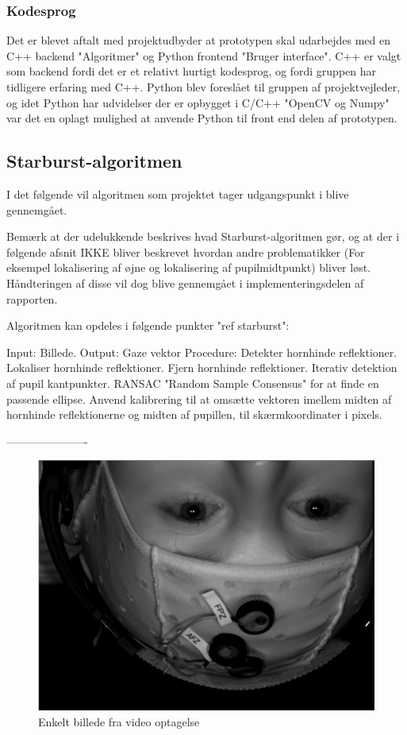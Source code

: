 \documentclass[rapport.tex]{subfiles}
\begin{document}
	\subsubsection{Kodesprog}
	Det er blevet aftalt med projektudbyder at prototypen skal udarbejdes med en C++ backend "Algoritmer" og Python frontend "Bruger interface".
	C++ er valgt som backend fordi det er et relativt hurtigt kodesprog, og fordi gruppen har tidligere erfaring
	med C++. Python blev foreslået til gruppen af projektvejleder, og idet Python har udvidelser der er opbygget
	i C/C++ "OpenCV og Numpy" var det en oplagt mulighed at anvende Python til front end delen af prototypen.
	                           
	\subsection{Starburst-algoritmen}
	I det følgende vil algoritmen som projektet tager udgangspunkt i blive gennemgået.
	
	Bemærk at der udelukkende beskrives hvad Starburst-algoritmen gør, og at der i følgende afsnit IKKE bliver beskrevet hvordan andre problematikker (For eksempel lokalisering af øjne og lokalisering af pupilmidtpunkt) bliver løst. Håndteringen af disse vil dog blive gennemgået i implementeringsdelen af rapporten.
	
	Algoritmen kan opdeles i følgende punkter "ref starburst":
	
	Input: Billede.
	Output: Gaze vektor
	Procedure:
	Detekter hornhinde reflektioner.
	Lokaliser hornhinde reflektioner.
	Fjern hornhinde reflektioner.
	Iterativ detektion af pupil kantpunkter.
	RANSAC "Random Sample Consensus" for at finde en passende ellipse.
	Anvend kalibrering til at omsætte vektoren imellem midten af hornhinde reflektionerne og midten af pupillen, til skærmkoordinater i pixels.
	
	----------------------
	
	\begin{figure}
	\centering
	\includegraphics[width=0.4\linewidth]{Billeder/InitialImage.png}
	\caption{Enkelt billede fra video optagelse}
	\label{fig:InitialImage}
	\end{figure}
	
\end{document}
